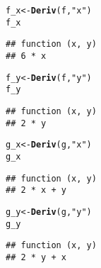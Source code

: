 \documentclass[11pt, a4paper]{article}\usepackage[]{graphicx}\usepackage[]{xcolor}
\makeatletter
\newcommand{\hlsng}[1]{\textcolor[rgb]{0.192,0.494,0.8}{#1}}%
\newcommand{\hldef}[1]{\textcolor[rgb]{0.345,0.345,0.345}{#1}}%
\newcommand{\hlkwb}[1]{\textcolor[rgb]{0.69,0.353,0.396}{#1}}%
\newcommand{\hlkwd}[1]{\textcolor[rgb]{0.737,0.353,0.396}{\textbf{#1}}}%
\newenvironment{kframe}{%
 \def\at@end@of@kframe{}%
 \ifinner\ifhmode%
  \def\at@end@of@kframe{\end{minipage}}%
  \begin{minipage}{\columnwidth}%
 \fi\fi%
 \def\FrameCommand##1{\hskip\@totalleftmargin \hskip-\fboxsep
 \colorbox{shadecolor}{##1}\hskip-\fboxsep
     \hskip-\linewidth \hskip-\@totalleftmargin \hskip\columnwidth}%
 \MakeFramed {\advance\hsize-\width
   \@totalleftmargin\z@ \linewidth\hsize
   \@setminipage}}%
 {\par\unskip\endMakeFramed%
 \at@end@of@kframe}
\newenvironment{knitrout}{}{} %
\makeatother
\begin{document}
\begin{knitrout}\footnotesize
{}\color{fgcolor}\begin{kframe}
\begin{alltt}
\hldef{f_x} \hlkwb{<-} \hlkwd{Deriv}\hldef{(f,} \hlsng{"x"}\hldef{)}
\hldef{f_x}
\end{alltt}
\begin{verbatim}
## function (x, y) 
## 6 * x
\end{verbatim}
\end{kframe}
\end{knitrout}

\begin{knitrout}\footnotesize
{}\color{fgcolor}\begin{kframe}
\begin{alltt}
\hldef{f_y} \hlkwb{<-} \hlkwd{Deriv}\hldef{(f,} \hlsng{"y"}\hldef{)}
\hldef{f_y}
\end{alltt}
\begin{verbatim}
## function (x, y) 
## 2 * y
\end{verbatim}
\end{kframe}
\end{knitrout}

\begin{knitrout}\footnotesize
{}\color{fgcolor}\begin{kframe}
\begin{alltt}
\hldef{g_x} \hlkwb{<-} \hlkwd{Deriv}\hldef{(g,} \hlsng{"x"}\hldef{)}
\hldef{g_x}
\end{alltt}
\begin{verbatim}
## function (x, y) 
## 2 * x + y
\end{verbatim}
\end{kframe}
\end{knitrout}

\begin{knitrout}\footnotesize
{}\color{fgcolor}\begin{kframe}
\begin{alltt}
\hldef{g_y} \hlkwb{<-} \hlkwd{Deriv}\hldef{(g,} \hlsng{"y"}\hldef{)}
\hldef{g_y}
\end{alltt}
\begin{verbatim}
## function (x, y) 
## 2 * y + x
\end{verbatim}
\end{kframe}
\end{knitrout}
\end{document}
